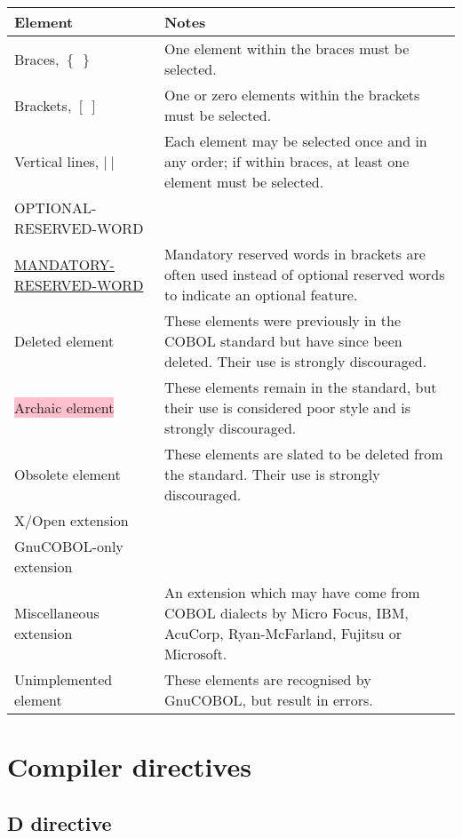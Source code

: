 \documentclass[a4paper,oneside,svgnames]{scrbook}
\newcommand{\key}[1]{\underline{#1}}
\newcommand{\deleted}[1]{%
  \colorbox{red!75}{#1}}
\newcommand{\archaic}[1]{%
  \colorbox{pink}{#1}}
\newcommand{\obsolete}[1]{%
  \colorbox{red!60}{#1}}
\newcommand{\xopen}[1]{%
  \colorbox{green!75}{#1}}
\newcommand{\gnucobol}[1]{%
  \colorbox{orange!75}{#1}}
\newcommand{\miscext}[1]{%
  \colorbox{blue!50}{#1}}
\newcommand{\pending}[1]{%
  \textcolor{gray!75}{#1}}
\begin{document}
\begin{table}[!h]
  \centering
  \begin{tabular}[!h]{p{} p{}}
    \toprule
    Element & Notes \\ \midrule
    Braces, $\left\{\ {}\right\}$ & One element within the braces must be selected. \\
    Brackets, $\left[\ {}\right]$ & One or zero elements within the brackets must be selected. \\
    Vertical lines, $\left|\ {}\right|$ & Each element may be selected once and in any order; if within braces, at least one element must be selected. \\
    OPTIONAL-RESERVED-WORD & \\
    \key{MANDATORY-RESERVED-WORD} & Mandatory reserved words in brackets are often used instead of optional reserved words to indicate an optional feature. \\
    \deleted{Deleted element} & These elements were previously in the COBOL standard but have since been deleted. Their use is strongly discouraged. \\
    \archaic{Archaic element} & These elements remain in the standard, but their use is considered poor style and is strongly discouraged. \\
    \obsolete{Obsolete element} & These elements are slated to be deleted from the standard. Their use is strongly discouraged. \\
    \xopen{X\slash{}Open extension} & \\
    \gnucobol{GnuCOBOL-only extension} & \\
    \miscext{Miscellaneous extension} & An extension which may have come from COBOL dialects by Micro Focus, IBM, AcuCorp, Ryan-McFarland, Fujitsu or Microsoft. \\
    \pending{Unimplemented element} & These elements are recognised by GnuCOBOL, but result in errors. \\ \bottomrule
  \end{tabular}
\end{table}
\chapter{Compiler directives}

\section{D directive}
\end{document}
